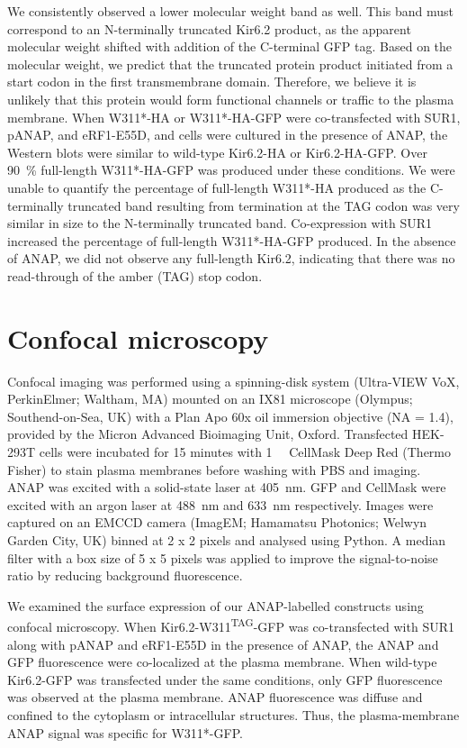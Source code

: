 We consistently observed a lower molecular weight band as well.
This band must correspond to an N-terminally truncated Kir6.2 product, as the apparent molecular weight shifted with addition of the C-terminal GFP tag.
Based on the molecular weight, we predict that the truncated protein product initiated from a start codon in the first transmembrane domain.
Therefore, we believe it is unlikely that this protein would form functional channels or traffic to the plasma membrane.
When W311*-HA or W311*-HA-GFP were co-transfected with SUR1, pANAP, and eRF1-E55D, and cells were cultured in the presence of ANAP, the Western blots were similar to wild-type Kir6.2-HA or Kir6.2-HA-GFP.
Over \SI{90}{\percent} full-length W311*-HA-GFP was produced under these conditions.
We were unable to quantify the percentage of full-length W311*-HA produced as the C-terminally truncated band resulting from termination at the TAG codon was very similar in size to the N-terminally truncated band.
Co-expression with SUR1 increased the percentage of full-length W311*-HA-GFP produced.
In the absence of ANAP, we did not observe any full-length Kir6.2, indicating that there was no read-through of the amber (TAG) stop codon.

\section{Confocal microscopy}
Confocal imaging was performed using a spinning-disk system (Ultra-VIEW VoX, PerkinElmer; Waltham, MA) mounted on an IX81 microscope (Olympus; Southend-on-Sea, UK) with a Plan Apo 60x oil immersion objective (NA = 1.4), provided by the Micron Advanced Bioimaging Unit, Oxford.
Transfected HEK-293T cells were incubated for 15 minutes with \SI{1}{\nano\Molar} CellMask Deep Red (Thermo Fisher) to stain plasma membranes before washing with PBS and imaging.
ANAP was excited with a solid-state laser at \SI{405}{\nano\metre}.
GFP and CellMask were excited with an argon laser at \SI{488}{\nano\metre} and \SI{633}{\nano\metre} respectively.
Images were captured on an EMCCD camera (ImagEM; Hamamatsu Photonics; Welwyn Garden City, UK) binned at 2 x 2 pixels and analysed using Python.
A median filter with a box size of 5 x 5 pixels was applied to improve the signal-to-noise ratio by reducing background fluorescence.

We examined the surface expression of our ANAP-labelled constructs using confocal microscopy.
When Kir6.2-W311\textsuperscript{TAG}-GFP was co-transfected with SUR1 along with pANAP and eRF1-E55D in the presence of ANAP, the ANAP and GFP fluorescence were co-localized at the plasma membrane.
When wild-type Kir6.2-GFP was transfected under the same conditions, only GFP fluorescence was observed at the plasma membrane.
ANAP fluorescence was diffuse and confined to the cytoplasm or intracellular structures.
Thus, the plasma-membrane ANAP signal was specific for W311*-GFP.

